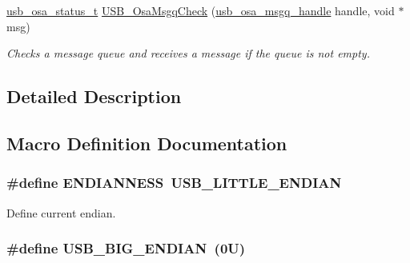 \begin{DoxyCompactItemize}
\hyperlink{group__usb__os__abstraction_ga8de2fb7579de0a6621bbc1776519b0a9}{usb\-\_\-osa\-\_\-status\-\_\-t} \hyperlink{group__usb__os__abstraction_ga734fbdd1bae936ba6758087ad2d9d862}{U\-S\-B\-\_\-\-Osa\-Msgq\-Check} (\hyperlink{group__usb__os__abstraction_gab3a9f26ba50f3abea7fcbac07500cbb8}{usb\-\_\-osa\-\_\-msgq\-\_\-handle} handle, void $\ast$msg)
\begin{DoxyCompactList}\small\item\em Checks a message queue and receives a message if the queue is not empty. \end{DoxyCompactList}\end{DoxyCompactItemize}


\subsection{Detailed Description}


\subsection{Macro Definition Documentation}
\hypertarget{group__usb__os__abstraction_ga10ef90ec5d824df4e5d923db4939e45c}{
\subsubsection[{E\-N\-D\-I\-A\-N\-N\-E\-S\-S}]{\setlength{\rightskip}{0pt plus 5cm}\#define E\-N\-D\-I\-A\-N\-N\-E\-S\-S~{\bf U\-S\-B\-\_\-\-L\-I\-T\-T\-L\-E\-\_\-\-E\-N\-D\-I\-A\-N}}}\label{group__usb__os__abstraction_ga10ef90ec5d824df4e5d923db4939e45c}


Define current endian. 

\hypertarget{group__usb__os__abstraction_gad5944548f0bdc76acfc43c033bd5a03c}{
\subsubsection[{U\-S\-B\-\_\-\-B\-I\-G\-\_\-\-E\-N\-D\-I\-A\-N}]{\setlength{\rightskip}{0pt plus 5cm}\#define U\-S\-B\-\_\-\-B\-I\-G\-\_\-\-E\-N\-D\-I\-A\-N~(0\-U)}}\label{group__usb__os__abstraction_gad5944548f0bdc76acfc43c033bd5a03c}


